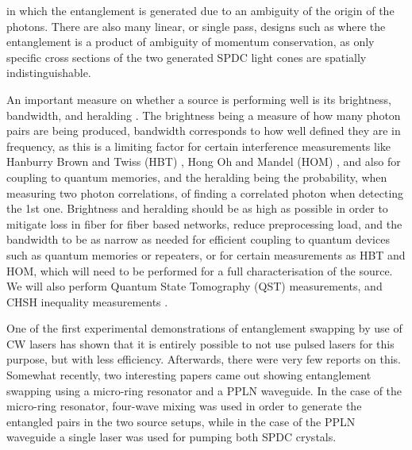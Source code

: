\documentclass{article}
\theoremstyle{mytheoremstyle}
\theoremstyle{mytheoremstyle}
\theoremstyle{myproblemstyle}
\begin{document}
\cite{Neumann_Buchner_Bulla_Bohmann_Ursin_2022_CW,Chen_Ecker_Wengerowsky_Bulla_Joshi_Steinlechner_Ursin_2018_CW}
in which the entanglement is generated due to an ambiguity of the origin of the photons.
There are also many linear, or single pass, designs such as \cite{Lee_Kim_Cha_Moon_2016,Kwiat_Mattle_Weinfurter_Zeilinger_Sergienko_Shih_1995}
where the entanglement is a product of ambiguity of momentum conservation, as only specific cross sections of the two generated SPDC light
cones are spatially indistinguishable.
\par An important measure on whether a source is performing well is its brightness, bandwidth, and heralding \cite{Bennink_2010,Ljunggren_Tengner_Marsden_Pelton_2006}.
The brightness being a measure of how many photon pairs are being produced, bandwidth corresponds to how well defined they are in frequency,
as this is a limiting factor for certain interference measurements like Hanburry Brown and Twiss (HBT) \cite{Brown_Twiss_1954},
Hong Oh and Mandel (HOM) \cite{Hong_Ou_Mandel_1987}, and also for coupling to quantum memories,
and the heralding being the probability, when measuring two photon correlations, of finding a correlated photon when detecting the 1st one.
Brightness and heralding should be as high as possible in order to mitigate loss in fiber for fiber based networks,
reduce preprocessing load, and the bandwidth to be as narrow as needed for efficient coupling to quantum devices such as quantum memories or repeaters,
or for certain measurements as HBT and HOM, which will need to be performed for a full characterisation of the source.
We will also perform Quantum State Tomography (QST) measurements, and CHSH inequality measurements \cite{Clauser_Horne_Shimony_Holt_1969}.
\par One of the first \cite{Halder_Beveratos_Jorel_Zbinden_Simon_Scarani_Gisin_2007} experimental demonstrations of entanglement swapping by use of CW lasers has shown that it
is entirely possible to not use pulsed lasers for this purpose, but with less efficiency. Afterwards, there were very few reports
on this. Somewhat recently, two \cite{Samara_Maring_Martin_Raja_Kippenberg_Zbinden_Thew_2021,Tsujimoto_Tanaka_Iwasaki_Ikuta_Miki_Yamashita_Terai_Yamamoto_Koashi_Imoto_2018}
interesting papers came out showing entanglement swapping using a micro-ring resonator and a PPLN waveguide. In the case of the micro-ring resonator, four-wave mixing
was used in order to generate the entangled pairs in the two source setups, while in the case of the PPLN waveguide a single laser was used for pumping both SPDC crystals.
\end{document}
